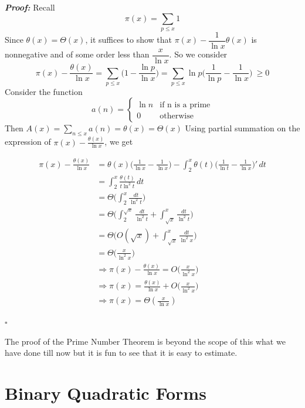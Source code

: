 \documentclass[a4paper,11pt,abstracton]{scrartcl}
\theoremstyle{dotlessP}
\theoremstyle{dotlessS}
\theoremstyle{remark}
\theoremstyle{definition}
\begin{document}
\begin{claim_box}
\textbf{\textit{Proof:}}
Recall
$$\pi(x)=\sum_{p \le x}1$$
Since $\theta(x)=\Theta(x)$, it suffices to show that $\pi(x)-\dfrac{1}{\ln x}\theta(x)$ is nonnegative and of some order less than $\dfrac{x}{\ln x}$. So we consider
\[\pi(x)-\frac{\theta(x)}{\ln x} = \sum_{p \leq x}\bigg(1-\frac{\ln p}{\ln x}\bigg) = \sum_{p \leq x}\ln{p}\bigg(\frac{1}{\ln p}-\frac{1}{\ln x}\bigg)\ \ge 0\]
Consider the function
\[
a(n) = 
\begin{cases}
    \ln n & \text{if n is a prime} \\
     0    & \text{otherwise } 
\end{cases}
\]
Then $A(x) = \sum_{n \le x}a(n) = \theta(x) = \Theta(x)$
Using partial summation on the expression of $\pi(x)-\frac{\theta(x)}{\ln x}$, we get

\begin{align*}
\pi(x)-\frac{\theta(x)}{\ln x} 
&= \theta(x)\bigg(\frac{1}{\ln x} - \frac{1}{\ln x}\bigg) - \int_2^x \theta(t)\bigg(\frac{1}{\ln t}-\frac{1}{\ln x}\bigg)' \,dt \\
&=\int_2^x \frac{\theta(t)}{t \ln^2t} \,dt \\
&= \Theta\bigg(\int_2^x \frac{\,dt}{\ln^2t}\bigg) \\
&=\Theta\bigg(\int_2^{\sqrt{x}}\frac{\,dt}{\ln^2t}+\int_{\sqrt{x}}^x  \frac{\,dt}{\ln^2t}\bigg) \\
&=\Theta\bigg(O(\sqrt{x}) + \int_{\sqrt{x}}^x \frac{\,dt}{\ln^2x}\bigg)  \\
&=\Theta\bigg(\frac{x}{\ln^2 x}\bigg) \\
&\Rightarrow \pi(x)-\frac{\theta(x)}{\ln x} = O\bigg(\frac{x}{\ln^2 x}\bigg)\\
&\Rightarrow \pi(x) = \frac{\theta(x)}{\ln x} + O\bigg(\frac{x}{\ln^2 x}\bigg)\\
&\Rightarrow \pi(x)=\Theta(\frac{x}{\ln x})
\end{align*}

\hfill$\square$
\end{claim_box}

The proof of the Prime Number Theorem is beyond the scope of this what we have done till now but it is fun to see that it is easy to estimate.

\section{Binary Quadratic Forms}
\end{document}
